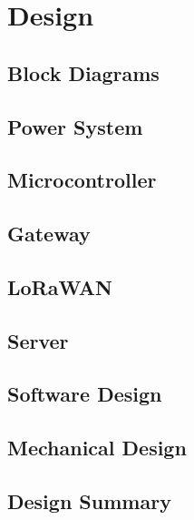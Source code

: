 \section{Design}
\subsection{Block Diagrams}








    \subsection{Power System}
    \subsection{Microcontroller}
    \subsection{Gateway}
    \subsection{LoRaWAN}
    \subsection{Server}
    \subsection{Software Design}
    \subsection{Mechanical Design}
    \subsection{Design Summary}

